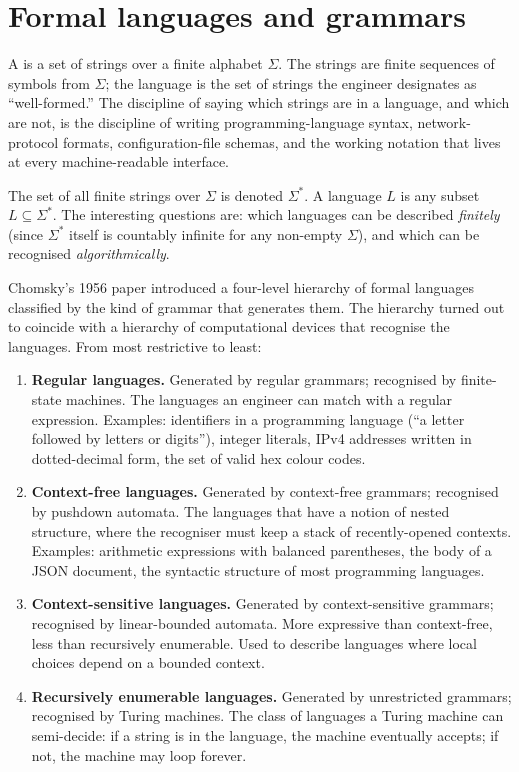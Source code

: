 \section{Formal languages and grammars}

A  is a set of strings over a finite alphabet $\Sigma$. The strings are finite sequences of symbols from $\Sigma$; the language is the set of strings the engineer designates as ``well-formed.'' The discipline of saying which strings are in a language, and which are not, is the discipline of writing programming-language syntax, network-protocol formats, configuration-file schemas, and the working notation that lives at every machine-readable interface.

The set of all finite strings over $\Sigma$ is denoted $\Sigma^*$. A language $L$ is any subset $L \subseteq \Sigma^*$. The interesting questions are: which languages can be described \emph{finitely} (since $\Sigma^*$ itself is countably infinite for any non-empty $\Sigma$), and which can be recognised \emph{algorithmically}.

Chomsky's 1956 paper \cite{hist:chomsky1956} introduced a four-level hierarchy of formal languages classified by the kind of grammar that generates them. The hierarchy turned out to coincide with a hierarchy of computational devices that recognise the languages. From most restrictive to least:

\begin{enumerate}[leftmargin=*]
  \item \textbf{Regular languages.} Generated by regular grammars; recognised by finite-state machines. The languages an engineer can match with a regular expression. Examples: identifiers in a programming language (``a letter followed by letters or digits''), integer literals, IPv4 addresses written in dotted-decimal form, the set of valid hex colour codes.
  \item \textbf{Context-free languages.} Generated by context-free grammars; recognised by pushdown automata. The languages that have a notion of nested structure, where the recogniser must keep a stack of recently-opened contexts. Examples: arithmetic expressions with balanced parentheses, the body of a JSON document, the syntactic structure of most programming languages.
  \item \textbf{Context-sensitive languages.} Generated by context-sensitive grammars; recognised by linear-bounded automata. More expressive than context-free, less than recursively enumerable. Used to describe languages where local choices depend on a bounded context.
  \item \textbf{Recursively enumerable languages.} Generated by unrestricted grammars; recognised by Turing machines. The class of languages a Turing machine can semi-decide: if a string is in the language, the machine eventually accepts; if not, the machine may loop forever.
\end{enumerate}

